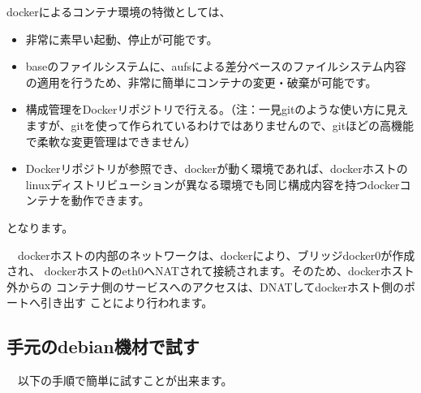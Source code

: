 \documentclass[mingoth,a4paper]{jsarticle}
\begin{document}
 dockerによるコンテナ環境の特徴としては、

\begin{itemize}
\item 非常に素早い起動、停止が可能です。
\item baseのファイルシステムに、aufsによる差分ベースのファイルシステム内容の適用を行うため、非常に簡単にコンテナの変更・破棄が可能です。
\item 構成管理をDockerリポジトリで行える。（注：一見gitのような使い方に見えますが、gitを使って作られているわけではありませんので、gitほどの高機能で柔軟な変更管理はできません）
\item Dockerリポジトリが参照でき、dockerが動く環境であれば、dockerホストのlinuxディストリビューションが異なる環境でも同じ構成内容を持つdockerコンテナを動作できます。
\end{itemize}

となります。

　dockerホストの内部のネットワークは、dockerにより、ブリッジdocker0が作成され、
dockerホストのeth0へNATされて接続されます。そのため、dockerホスト外からの
コンテナ側のサービスへのアクセスは、DNATしてdockerホスト側のポートへ引き出す
ことにより行われます。

\subsection{手元のdebian機材で試す}

　以下の手順で簡単に試すことが出来ます。
 
\end{document}
